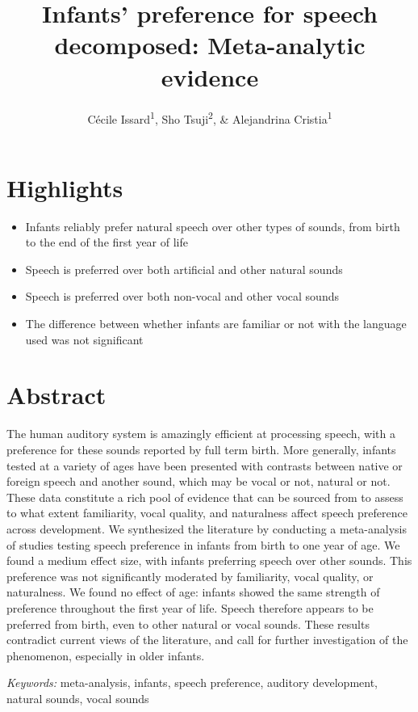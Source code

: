 \documentclass[man]{apa6}
\title{Infants' preference for speech decomposed: Meta-analytic evidence}
\author{Cécile Issard\textsuperscript{1}, Sho Tsuji\textsuperscript{2}, \&
Alejandrina Cristia\textsuperscript{1}}
\date{}
\affiliation{
\vspace{0.5cm}
\textsuperscript{1} Laboratoire de Sciences Cognitives et Psycholinguistique, Ecole Normale Supérieure, Département d'Études Cognitives\\\textsuperscript{2} International Research Center for Neurointelligence, The University of Tokyo}
\providecommand{\tightlist}{%
  \setlength{\itemsep}{0pt}\setlength{\parskip}{0pt}}
\begin{document}
\maketitle

\section{Highlights}\label{highlights}

\begin{itemize}
\tightlist
\item
  Infants reliably prefer natural speech over other types of sounds,
  from birth to the end of the first year of life
\item
  Speech is preferred over both artificial and other natural sounds
\item
  Speech is preferred over both non-vocal and other vocal sounds
\item
  The difference between whether infants are familiar or not with the
  language used was not significant
\end{itemize}

\section{Abstract}\label{abstract}

The human auditory system is amazingly efficient at processing speech,
with a preference for these sounds reported by full term birth. More
generally, infants tested at a variety of ages have been presented with
contrasts between native or foreign speech and another sound, which may
be vocal or not, natural or not. These data constitute a rich pool of
evidence that can be sourced from to assess to what extent familiarity,
vocal quality, and naturalness affect speech preference across
development. We synthesized the literature by conducting a meta-analysis
of studies testing speech preference in infants from birth to one year
of age. We found a medium effect size, with infants preferring speech
over other sounds. This preference was not significantly moderated by
familiarity, vocal quality, or naturalness. We found no effect of age:
infants showed the same strength of preference throughout the first year
of life. Speech therefore appears to be preferred from birth, even to
other natural or vocal sounds. These results contradict current views of
the literature, and call for further investigation of the phenomenon,
especially in older infants.

\emph{Keywords:} meta-analysis, infants, speech preference, auditory
development, natural sounds, vocal sounds
\end{document}
